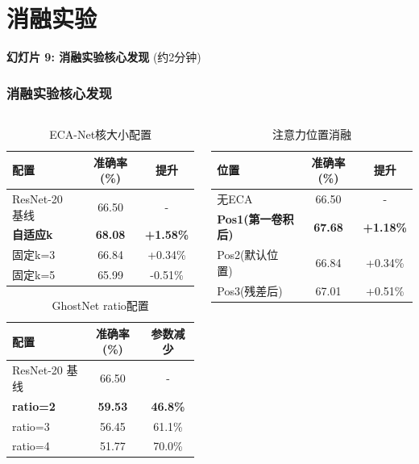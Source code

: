 \documentclass[10pt]{beamer}
\begin{document}
\section{消融实验}
\begin{frame}{\textbf{幻灯片 9: 消融实验核心发现} (约2分钟)}
\frametitle{消融实验核心发现}

\begin{columns}[T]
    \begin{column}{0.49\textwidth}
        \begin{table}[h]
        \centering
        {\scriptsize
        \begin{tabular}{|l|c|c|}
        \hline
        配置 & 准确率(\%) & 提升 \\
        \hline
        ResNet-20 基线 & 66.50 & - \\
        \textbf{自适应k} & \textbf{68.08} & \textbf{+1.58\%} \\
        固定k=3 & 66.84 & +0.34\% \\
        固定k=5 & 65.99 & -0.51\% \\
        \hline
        \end{tabular}
        \caption{ECA-Net核大小配置}}
        \end{table}
        
        \vspace{0.5em}
        \begin{table}[h]
        \centering
        {\scriptsize
        \begin{tabular}{|l|c|c|}
        \hline
        配置 & 准确率(\%) & 参数减少 \\
        \hline
        ResNet-20 基线 & 66.50 & - \\
        \textbf{ratio=2} & \textbf{59.53} & \textbf{46.8\%} \\
        ratio=3 & 56.45 & 61.1\% \\
        ratio=4 & 51.77 & 70.0\% \\
        \hline
        \end{tabular}
        \caption{GhostNet ratio配置}}
        \end{table}
    \end{column}
    \begin{column}{0.49\textwidth}
        \begin{table}[h]
        \centering
        {\scriptsize
        \begin{tabular}{|l|c|c|}
        \hline
        位置 & 准确率(\%) & 提升 \\
        \hline
        无ECA & 66.50 & - \\
        \textbf{Pos1(第一卷积后)} & \textbf{67.68} & \textbf{+1.18\%} \\
        Pos2(默认位置) & 66.84 & +0.34\% \\
        Pos3(残差后) & 67.01 & +0.51\% \\
        \hline
        \end{tabular}
        \caption{注意力位置消融}}
        \end{table}
        

\end{column}
\end{columns}
\end{frame}
\end{document}
